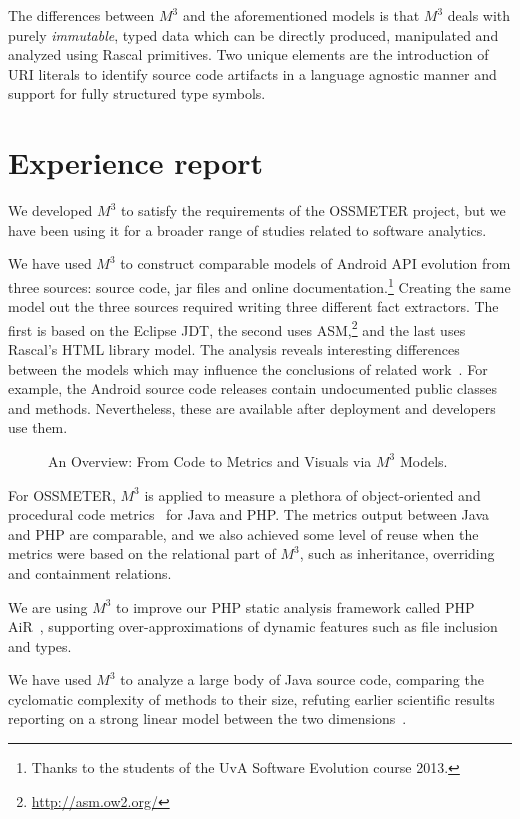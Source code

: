 \documentclass[conference]{IEEEtran}
\newcommand{\mthree}{\ensuremath{M^3}\xspace}
\begin{document}
The differences between \mthree and the aforementioned models is that \mthree
deals with purely \emph{immutable}, typed data which can be directly
produced, manipulated and analyzed using Rascal primitives. Two unique
elements are the introduction of URI literals to identify source code
artifacts in a language agnostic manner and support for fully structured type
symbols.

\section{Experience report}

We developed \mthree to satisfy the requirements of the OSSMETER project, but
we have been using it for a broader range of studies related to software
analytics.

We have used \mthree to construct comparable models of Android API evolution
from three sources: source code, jar files and online
documentation.\!\footnote{Thanks to the students of the UvA Software
Evolution course 2013.}
Creating the same model out the three sources required writing three different
fact extractors. The first is based on the Eclipse JDT, the second uses
ASM,\!\footnote{\url{http://asm.ow2.org/}} and the last uses Rascal's HTML
library model. The analysis reveals interesting differences between the models
which may influence the conclusions of related work~\cite{apianalysis}. For example, the Android source code releases contain undocumented public classes and methods. Nevertheless, these are available after deployment and developers use them. 

\begin{figure}[t]
	\resizebox{\columnwidth}{!}{}
\caption{An Overview: From Code to Metrics and Visuals via \mthree Models.}
\vspace{-5mm}
\end{figure}
For OSSMETER, \mthree is applied to measure a plethora of object-oriented and
procedural code metrics~\cite{mood,ck} for Java and PHP. The metrics output
between Java and PHP are comparable, and we also achieved some level of reuse
when the metrics were based on the relational part of \mthree, such as
inheritance, overriding and containment relations.

We are using \mthree to improve our PHP static analysis framework called PHP
AiR~\cite{phpair}, supporting over-approximations of dynamic features such as
file inclusion~\cite{ase2014} and types.

We have used \mthree to analyze a large body of Java source code, comparing
the cyclomatic complexity of methods to their size, refuting earlier
scientific results reporting on a strong linear model between the two
dimensions~\cite{davy}.
\end{document}
